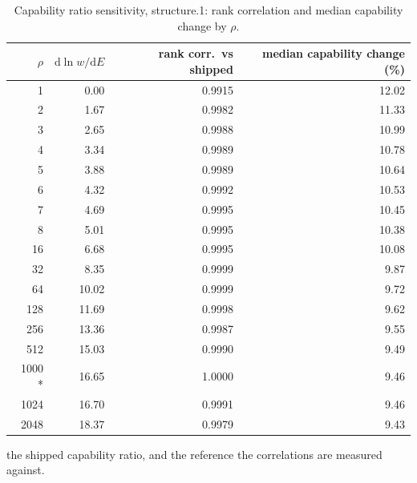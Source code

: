 \begin{table}[htbp]
  \centering
  \caption{Capability ratio sensitivity, structure.1: rank correlation and median capability change by $\rho$.}
  \label{tab:rho-structure-1-summary}
  \begin{tabular}{r r r r}
    \toprule
    $\rho$ & $\mathrm{d}\ln w/\mathrm{d}E$ & rank corr.\ vs shipped & median capability change (\%) \\
    \midrule
    1 & 0.00 & 0.9915 & 12.02 \\
    2 & 1.67 & 0.9982 & 11.33 \\
    3 & 2.65 & 0.9988 & 10.99 \\
    4 & 3.34 & 0.9989 & 10.78 \\
    5 & 3.88 & 0.9989 & 10.64 \\
    6 & 4.32 & 0.9992 & 10.53 \\
    7 & 4.69 & 0.9995 & 10.45 \\
    8 & 5.01 & 0.9995 & 10.38 \\
    16 & 6.68 & 0.9995 & 10.08 \\
    32 & 8.35 & 0.9999 & 9.87 \\
    64 & 10.02 & 0.9999 & 9.72 \\
    128 & 11.69 & 0.9998 & 9.62 \\
    256 & 13.36 & 0.9987 & 9.55 \\
    512 & 15.03 & 0.9990 & 9.49 \\
    1000 * & 16.65 & 1.0000 & 9.46 \\
    1024 & 16.70 & 0.9991 & 9.46 \\
    2048 & 18.37 & 0.9979 & 9.43 \\
    \bottomrule
  \end{tabular}
  \par\smallskip\footnotesize * the shipped capability ratio, and the reference the correlations are measured against.
\end{table}
